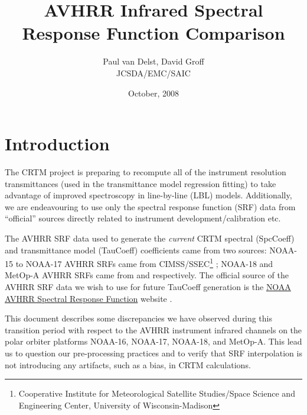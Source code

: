 



\title{AVHRR Infrared Spectral Response Function Comparison}
\author{Paul van Delst, David Groff\\JCSDA/EMC/SAIC}
\date{October, 2008}



\maketitle



\section{Introduction}
The CRTM project is preparing to recompute all of the instrument resolution transmittances (used in the transmittance model regression fitting) to take advantage of improved spectroscopy in line-by-line (LBL) models. Additionally, we are endeavouring to use only the spectral response function (SRF) data from ``official'' sources directly related to instrument development/calibration etc.

The AVHRR SRF data used to generate the \textit{current} CRTM spectral (SpcCoeff) and transmittance model (TauCoeff) coefficients came from two sources: NOAA-15 to NOAA-17 AVHRR SRFs came from CIMSS/SSEC\footnote{Cooperative Institute for Meteorological Satellite Studies/Space Science and Engineering Center, University of Wisconsin-Madison} \citep{CIMSS_SRFs}; NOAA-18 and MetOp-A AVHRR SRFs came from \citet{Sullivan_avhrr3_n18_srf} and \citet{Sullivan_avhrr3_metop-a_srf} respectively. 
The official source of the AVHRR SRF data we wish to use for future TauCoeff generation is the  \href{http://www.star.nesdis.noaa.gov/smcd/spb/fwu/solar_cal/spec_resp_func}{NOAA AVHRR Spectral Response Function} website \citep{NESDIS_AVHRR_SRFs}.

This document describes some discrepancies we have observed during this transition period with respect to the AVHRR instrument infrared channels on the polar orbiter platforms NOAA-16, NOAA-17, NOAA-18, and MetOp-A. This lead us to question our pre-processing practices and to verify that SRF interpolation is not introducing any artifacts, such as a bias, in CRTM calculations.



